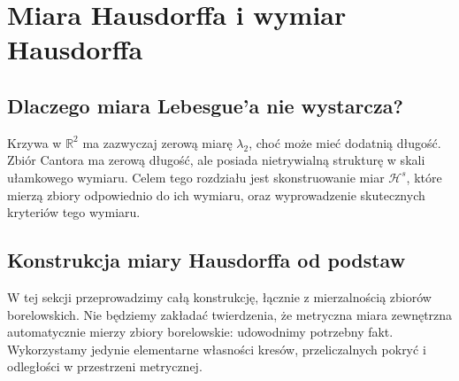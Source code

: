 \chapter{Miara Hausdorffa i wymiar Hausdorffa}
\label{ch:hausdorff-26}

\section{Dlaczego miara Lebesgue'a nie wystarcza?}
Krzywa w $\mathbb R^2$ ma zazwyczaj zerową miarę
$\lambda_2$, choć może mieć dodatnią długość.
Zbiór Cantora ma zerową długość, ale posiada nietrywialną
strukturę w skali ułamkowego wymiaru. Celem tego
rozdziału jest skonstruowanie miar $\mathcal H^s$,
które mierzą zbiory odpowiednio do ich wymiaru, oraz
wyprowadzenie skutecznych kryteriów tego wymiaru.

\section{Konstrukcja miary Hausdorffa od podstaw}
\label{sec:hausdorff-konstrukcja-26}

W tej sekcji przeprowadzimy całą konstrukcję, łącznie z
mierzalnością zbiorów borelowskich. Nie będziemy zakładać
twierdzenia, że metryczna miara zewnętrzna automatycznie
mierzy zbiory borelowskie: udowodnimy potrzebny fakt.
Wykorzystamy jedynie elementarne własności kresów,
przeliczalnych pokryć i odległości w przestrzeni metrycznej.

